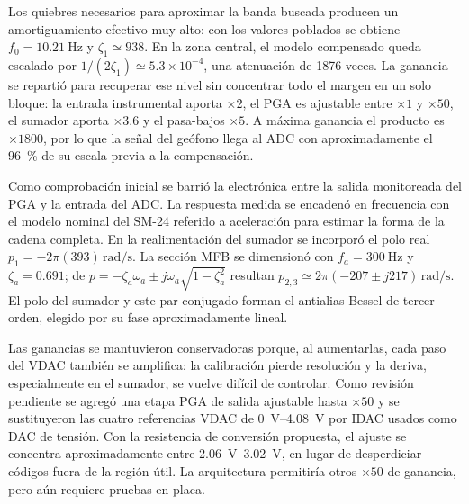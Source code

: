 Los quiebres necesarios para aproximar la banda buscada producen un amortiguamiento
efectivo muy alto: con los valores poblados se obtiene $f_0=\SI{10.21}{\hertz}$ y
$\zeta_1\simeq938$. En la zona central, el modelo compensado queda escalado por
$1/(2\zeta_1)\simeq5.3\times10^{-4}$, una atenuación de 1876 veces. La ganancia
se repartió para recuperar ese nivel sin concentrar todo el margen en un solo bloque:
la entrada instrumental
aporta $\times2$, el PGA es ajustable entre $\times1$ y $\times50$, el sumador aporta
$\times3.6$ y el pasa-bajos $\times5$. A máxima ganancia el producto es $\times1800$,
por lo que la señal del geófono llega al ADC con aproximadamente el \SI{96}{\percent}
de su escala previa a la compensación.

Como comprobación inicial se barrió la electrónica entre la salida monitoreada del PGA
y la entrada del ADC. La respuesta medida se encadenó en frecuencia con el modelo
nominal del SM-24 referido a aceleración para estimar la forma de la cadena completa.
En la realimentación del sumador se incorporó el polo real
$p_1=-2\pi(393)\,\mathrm{rad/s}$. La sección MFB se dimensionó con
$f_a=\SI{300}{\hertz}$ y $\zeta_a=0.691$; de
$p=-\zeta_a\omega_a\pm j\omega_a\sqrt{1-\zeta_a^2}$ resultan
$p_{2,3}\simeq2\pi(-207\pm j217)\,\mathrm{rad/s}$. El polo del sumador y este par
conjugado forman el antialias Bessel de tercer orden, elegido por su fase
aproximadamente lineal.

Las ganancias se mantuvieron conservadoras porque, al aumentarlas, cada paso del VDAC
también se amplifica: la calibración pierde resolución y la deriva, especialmente en el
sumador, se vuelve difícil de controlar. Como revisión pendiente se agregó una etapa
PGA de salida ajustable hasta $\times50$ y se sustituyeron las cuatro referencias VDAC
de \SIrange{0}{4.08}{\volt} por IDAC usados como DAC de tensión. Con la resistencia de
conversión propuesta, el ajuste se concentra aproximadamente entre
\SIrange{2.06}{3.02}{\volt}, en lugar de desperdiciar códigos fuera de la región útil.
La arquitectura permitiría otros $\times50$ de ganancia, pero aún requiere pruebas en
placa.

